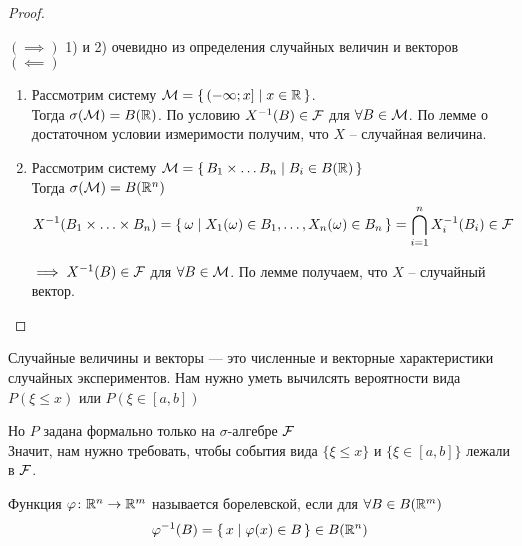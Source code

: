 \begin{proof}~

  $(\implies)$ 1) и 2) очевидно из определения случайных величин и векторов\\

  $(\impliedby)$ \nolinebreak
  \begin{enumerate}
    \item 
      Рассмотрим систему $\mathcal{M} = \left\{ \, (-\infty; x] \mid x \in \mathbb{R} \, \right\}$.\\
      Тогда  $\sigma(\mathcal{M}) = B(\mathbb{R})$. По условию $X^{-1} (B) \in \mathcal{F}$ для 
      $\forall B \in \mathcal{M}$. По лемме о достаточном условии измеримости получим, 
      что $X$ -- случайная величина.

    \item 
      Рассмотрим систему $\mathcal{M} = \left\{ \, B_1 \times \ldots B_n \mid B_i \in B(\mathbb{R}) \, \right\}$\\
      Тогда $\sigma(\mathcal{M}) = B(\mathbb{R}^n)$
      \begin{align*}
        &X^{-1} (B_1 \times \ldots \times B_n) = 
        \left\{ \, \omega \mid X_1(\omega) \in B_1, \ldots, X_n(\omega) \in B_n \, \right\}
        = \bigcap_{i = 1}^{n} X^{-1}_i (B_i) \in \mathcal{F}
      \end{align*}

      $\implies X^{-1} (B) \in \mathcal{F}$ для $\forall B \in \mathcal{M}$. По лемме получаем, 
      что $X$ -- случайный вектор.
  \end{enumerate}

\end{proof}


Случайные величины и векторы --- это численные и векторные характеристики случайных экспериментов. Нам нужно уметь вычилсять вероятности вида $P(\xi \leq x)$ или $P(\xi \in [a, b])$

Но $P$ задана формально только на $\sigma$-алгебре $\mathcal{F}$\\
Значит, нам нужно требовать, чтобы события вида $\{ \xi \leq x \}$ и 
$\{\xi \in [a, b]\}$ лежали в $\mathcal{F}$.


\begin{definition}
  Функция $\varphi\colon \mathbb{R}^n \to \mathbb{R}^m$ называется борелевской, 
  если для $\forall B \in B(\mathbb{R}^m)$
  \begin{align*}
    \varphi^{-1} (B) = \left\{ \, x \mid \varphi(x) \in B \, \right\} \in B(\mathbb{R}^n)
  \end{align*}
\end{definition}

